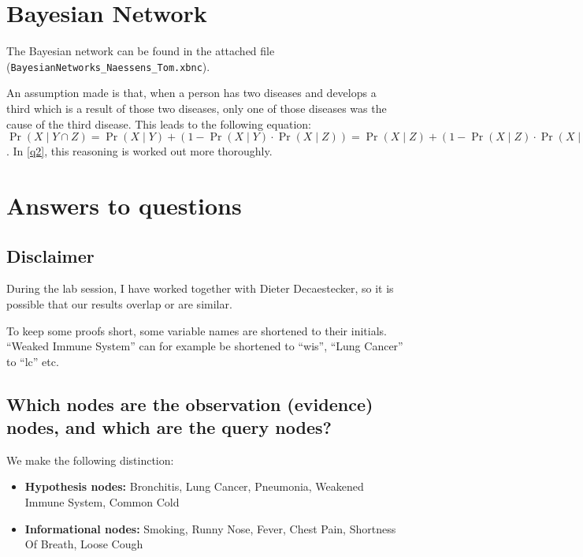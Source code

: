 \documentclass[12pt, a4paper]{article}
\begin{document}



\pagestyle{fancy}

\section{Bayesian Network}
The Bayesian network can be found in the attached file (\texttt{BayesianNetworks\_Naessens\_Tom.xbnc}).

An assumption made is that, when a person has two diseases and develops a third which is a result of those two diseases, only one of those diseases was the cause of the third disease. This leads to the following equation: $\Pr(X \mid Y \cap Z) = \Pr(X \mid Y) + (1 - \Pr(X \mid Y) \cdot \Pr(X \mid Z)) = \Pr(X \mid Z) + (1 - \Pr(X \mid Z) \cdot \Pr(X \mid Y))$. In \ref{q2}, this reasoning is worked out more thoroughly.

\section{Answers to questions}
\subsection*{Disclaimer}
During the lab session, I have worked together with Dieter Decaestecker, so it is possible that our results overlap or are similar.

To keep some proofs short, some variable names are shortened to their initials. ``Weaked Immune System'' can for example be shortened to ``wis'', ``Lung Cancer'' to ``lc'' etc.

\subsection{Which nodes are the observation (evidence) nodes, and which are the query nodes?}
We make the following distinction:
\begin{itemize}
\item \textbf{Hypothesis nodes:} Bronchitis, Lung Cancer, Pneumonia, Weakened Immune System, Common Cold
\item \textbf{Informational nodes:} Smoking, Runny Nose, Fever, Chest Pain, Shortness Of Breath, Loose Cough
\end{itemize}
\end{document}
